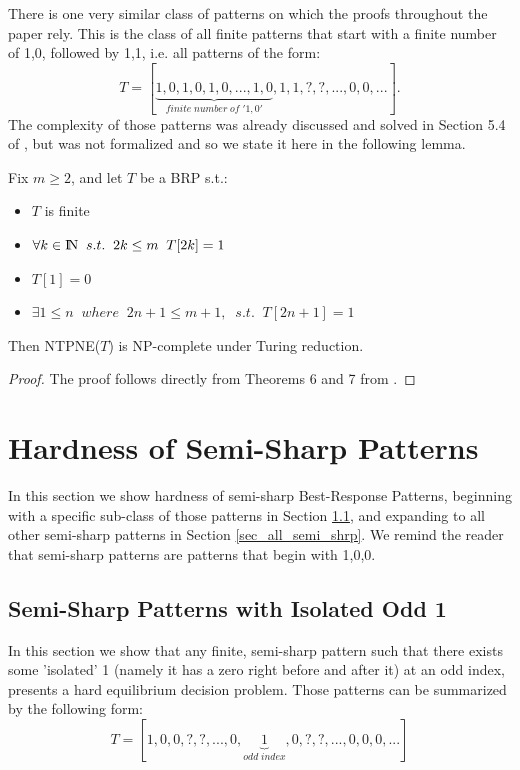 \documentclass[runningheads]{llncs}
\begin{document}
There is one very similar class of patterns on which the proofs throughout the paper rely. This is the class of all finite patterns that start with a finite number of 1,0, followed by 1,1, i.e. all patterns of the form:
\[T=[\underbrace{1,0,1,0,1,0,...,1,0}_{finite\;number\;of\;'1,0'},1,1,?,?,...,0,0,...].\]
The complexity of those patterns was already discussed and solved in Section 5.4 of \cite{Gilboa_Nisan_public_goods}, but was not formalized and so we state it here in the following lemma. 
\begin{lemma}
\label{lem_alternating_with_odd}
Fix $m\geq 2$, and let $T$ be a BRP s.t.:
    \begin{itemize}
        \item $T$ is finite
        \item $\forall k\in {\rm I\!N} \;\;s.t.\;\; 2k\leq m \;\; T[2k]=1$
        \item $T[1]=0$
        \item $\exists 1\leq n \;\;where\;\; 2n+1\leq m+1, \;\;s.t.\;\; T[2n+1]=1$
    \end{itemize}
Then NTPNE($T$) is NP-complete under Turing reduction.
\end{lemma}

\begin{proof}
The proof follows directly from Theorems 6 and 7 from \cite{Gilboa_Nisan_public_goods}.   
\end{proof}


\section{Hardness of Semi-Sharp Patterns}
\label{sec_semi_shrp_general}
In this section we show hardness of semi-sharp Best-Response Patterns, beginning with a specific sub-class of those patterns in Section \ref{sec_semi_shrp_isolated}, and expanding to all other semi-sharp patterns in Section \ref{sec_all_semi_shrp}. We remind the reader that semi-sharp patterns are patterns that begin with 1,0,0.

\subsection{Semi-Sharp Patterns with Isolated Odd 1}
\label{sec_semi_shrp_isolated}
In this section we show that any finite, semi-sharp pattern such that there exists some 'isolated' 1 (namely it has a zero right before and after it) at an odd index, presents a hard equilibrium decision problem. Those patterns can be summarized by the following form:
\[T=[1,0,0,?,?,...,0,\underbrace{1}_{odd\; index},0,?,?,...,0,0,0,...]\]
\end{document}

